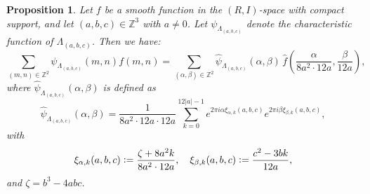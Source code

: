 \documentclass{article}
\newtheorem{proposition}[theorem]{Proposition}
\begin{document}
\begin{proposition}\label{Poisson} 
Let $f$ be a smooth function in the $(R, I)$-space with compact support, and let $(a, b, c) \in \mathbb{Z}^3$ with $a \neq 0$. Let $\psi_{\Lambda_{(a, b, c)}}$ denote the characteristic function of $\Lambda_{(a, b, c)}$. Then we have: \begin{equation*} 
\sum_{(m, n) \in \mathbb{Z}^2} \psi_{\Lambda_{(a, b, c)}}(m, n) f(m, n) = \sum_{(\alpha, \beta) \in \mathbb{Z}^2} \widehat{\psi}_{\Lambda_{(a, b, c)}}(\alpha, \beta) \, \widehat{f} \left( \frac{\alpha}{8a^2 \cdot 12a}, \frac{\beta}{12a} \right), \end{equation*}
where $\widehat{\psi}_{\Lambda_{(a, b, c)}}(\alpha, \beta)$ is defined as \begin{equation*} 
\widehat{\psi}_{\Lambda_{(a, b, c)}}(\alpha, \beta) = \frac{1}{8a^2 \cdot 12a \cdot 12a} \sum_{k=0}^{12|a| - 1} e^{2 \pi i \alpha \xi_{\alpha,k}(a, b, c)} e^{2 \pi i \beta \xi_{\beta,k}(a, b, c)}, 
\end{equation*} 
with
\begin{equation*} \xi_{\alpha,k}(a, b, c) \vcentcolon= \frac{\zeta + 8a^2 k}{8a^2 \cdot 12a}, \quad \xi_{\beta,k}(a, b, c) \vcentcolon= \frac{c^2 - 3bk}{12a}, \end{equation*} and $\zeta = b^3 - 4abc$. \end{proposition}
\end{document}
